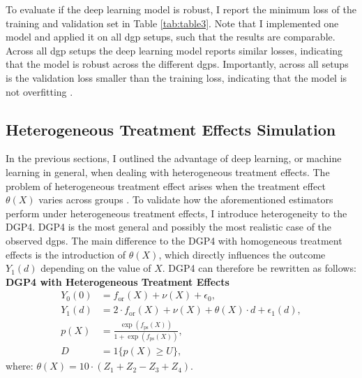 To evaluate if the deep learning model is robust, I report the minimum loss of the training and validation set in Table \ref{tab:table3}.
Note that I implemented one model and applied it on all \ac{dgp} setups, such that the results are comparable.
Across all \ac{dgp} setups the deep learning model reports similar losses, indicating that the model is robust across the different \ac{dgp}s.
Importantly, across all setups is the validation loss smaller than the training loss, indicating that the model is not overfitting \citep[see][]{Goodfellow-et-al-2016,farrellDeepNeuralNetworks2021}.





\subsection{Heterogeneous Treatment Effects Simulation}
In the previous sections, I outlined the advantage of deep learning, or machine learning in general, when dealing with heterogeneous treatment effects.
The problem of heterogeneous treatment effect arises when the treatment effect $\theta(X)$ varies across groups \citep{hansen2022econometrics}.
To validate how the aforementioned estimators perform under heterogeneous treatment effects, I introduce heterogeneity to the DGP4.
DGP4 is the most general and possibly the most realistic case of the observed \ac{dgp}s.
The main difference to the DGP4 with homogeneous treatment effects is the introduction of $\theta(X)$, which directly influences the outcome $Y_1(d)$ depending on the value of $X$.
DGP4 can therefore be rewritten as follows:
\\
\textbf{DGP4 with Heterogeneous Treatment Effects}
\begin{align*}
    Y_0(0) &= f_{\text{or}}(X) + \nu(X) + \epsilon_0, \\
    Y_1(d) &= 2 \cdot f_{\text{or}}(X) + \nu(X) + \theta(X) \cdot d + \epsilon_1(d), \\
    p(X) &= \frac{\exp \left( f_{\text{ps}}(X) \right)}{1 + \exp \left( f_{\text{ps}}(X) \right)}, \\
    D &= 1\{ p(X) \geq U \},
\end{align*}
where: $\theta(X) = 10 \cdot (Z_1 + Z_2 - Z_3 + Z_4)$.\\

